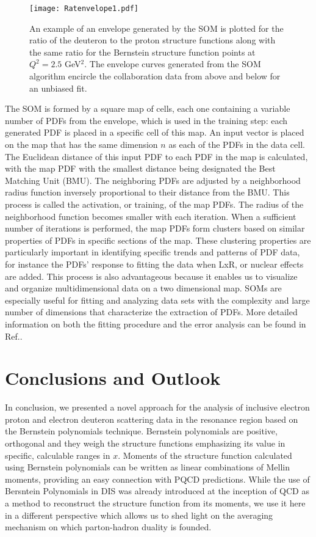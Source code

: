 \documentclass[
twocolumn,
aps,prd,
nofootinbib,
superscriptaddress,
showpacs,ligh
tightenlines, 
]{revtex4}
\begin{document}
\begin{figure}[htp]
\texttt{[image: Ratenvelope1.pdf]}
\caption{An example of an envelope generated by the SOM is plotted for the ratio of the deuteron to the proton structure functions along with the same ratio for the Bernstein structure function points at $Q^{2} = 2.5$ GeV$^{2}$.   The envelope curves generated from the SOM algorithm encircle the collaboration data from above and below for an unbiased fit.  }
\label{fig:SOMEnvelope}
\end{figure}
The SOM is formed by a square map of cells, each one containing a variable number of PDFs from the envelope, which is used in the training step: each generated PDF is placed in a specific cell of this map.  An input vector is placed on the map that has the same dimension $n$ as each of the PDFs in the data cell.  The Euclidean distance of this input PDF to each PDF in the map is calculated, with the map PDF with the smallest distance being designated the Best Matching Unit (BMU).  The neighboring PDFs are adjusted by a neighborhood radius function inversely proportional to their distance from the BMU.  This process is called the activation, or training, of the map PDFs.  The radius of the neighborhood function becomes smaller with each iteration.  When a sufficient number of iterations is performed, the map PDFs form clusters based on similar properties of PDFs in specific sections of the map.  These clustering properties are particularly important in identifying specific trends and patterns of PDF data, for instance the PDFs' response to fitting the data when LxR, or nuclear effects are added.  This process is also advantageous because it enables us to visualize and organize multidimensional data on a two dimensional map.  SOMs are especially useful for fitting and analyzing data sets with the complexity and large number of dimensions that characterize the extraction of PDFs. More detailed information on both the fitting procedure and the error analysis can be found in Ref.\cite{Askanazi:2014gxa}. 
%

\section{Conclusions and Outlook}
\label{sec4}
In conclusion, we presented a novel approach for the analysis of  inclusive electron proton and electron deuteron scattering data in the resonance region based on the Bernstein polynomials technique. Bernstein polynomials are positive, orthogonal and they weigh the structure functions emphasizing its value in specific, calculable ranges in $x$. Moments of the structure function calculated using Bernstein polynomials can be written as linear combinations of Mellin moments, providing an easy connection with PQCD predictions. While the use of Bersntein Polynomials in DIS was already introduced at the inception of QCD as a method to reconstruct the structure function from its moments, we use it here in a different perspective which allows us to shed light on the averaging mechanism on which parton-hadron duality is founded.
\end{document}
